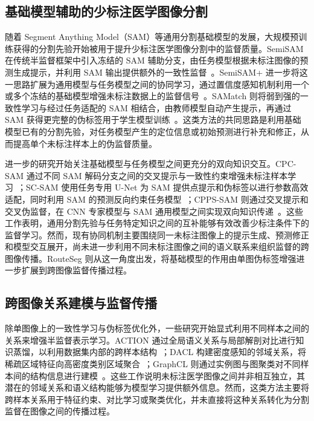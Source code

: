 \documentclass[UTF8,a4paper,10pt,twocolumn]{ctexart}
\begin{document}
\subsection{基础模型辅助的少标注医学图像分割}

随着 Segment Anything Model（SAM）等通用分割基础模型的发展，大规模预训练获得的分割先验开始被用于提升少标注医学图像分割中的监督质量。SemiSAM 在传统半监督框架中引入冻结的 SAM 辅助分支，由任务模型根据未标注图像的预测生成提示，并利用 SAM 输出提供额外的一致性监督~\cite{zhang2023semisam}。SemiSAM+ 进一步将这一思路扩展为通用模型与任务模型之间的协同学习，通过置信度感知机制利用一个或多个冻结的基础模型增强未标注数据上的监督信号~\cite{zhang2025semisamplus}。SAMatch 则将弱到强的一致性学习与经过任务适配的 SAM 相结合，由教师模型自动产生提示，再通过 SAM 获得更完整的伪标签用于学生模型训练~\cite{xu2024samatch}。这类方法的共同思路是利用基础模型已有的分割先验，对任务模型产生的定位信息或初始预测进行补充和修正，从而提高单个未标注样本上的伪监督质量。

进一步的研究开始关注基础模型与任务模型之间更充分的双向知识交互。CPC-SAM 通过不同 SAM 解码分支之间的交叉提示与一致性约束增强未标注样本学习~\cite{miao2024cpcsam}；SC-SAM 使用任务专用 U-Net 为 SAM 提供点提示和伪标签以进行参数高效适配，同时利用 SAM 的预测反向约束任务模型~\cite{vu2026scsam}；CPPS-SAM 则通过交叉提示和交叉伪监督，在 CNN 专家模型与 SAM 通用模型之间实现双向知识传递~\cite{zhang2026cppssam}。这些工作表明，通用分割先验与任务特定知识之间的互补能够有效改善少标注条件下的监督学习。然而，现有协同机制主要围绕同一未标注图像上的提示生成、预测修正和模型交互展开，尚未进一步利用不同未标注图像之间的语义联系来组织监督的跨图像传播。RouteSeg 则从这一角度出发，将基础模型的作用由单图伪标签增强进一步扩展到跨图像监督传播过程。

\subsection{跨图像关系建模与监督传播}

除单图像上的一致性学习与伪标签优化外，一些研究开始显式利用不同样本之间的关系来增强半监督表示学习。ACTION 通过全局语义关系与局部解剖对比进行知识蒸馏，以利用数据集内部的跨样本结构~\cite{you2022action}；DACL 构建密度感知的邻域关系，将稀疏区域特征向高密度类别区域聚合~\cite{tang2024dacl}；GraphCL 则通过实例图与图聚类对不同样本间的结构信息进行建模~\cite{wang2024graphcl}。这些工作说明未标注医学图像之间并非相互独立，其潜在的邻域关系和语义结构能够为模型学习提供额外信息。然而，这类方法主要将跨样本关系用于特征约束、对比学习或聚类优化，并未直接将这种关系转化为分割监督在图像之间的传播过程。
\end{document}
